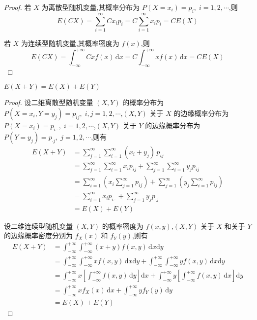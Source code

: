 \begin{proof}
    若 $X$ 为离散型随机变量,其概率分布为 $P(X=x_i)=p_i, \; i=1,2,\cdots$,则
    $$
    E(CX) = \sum_{i=1}^{\infty} C x_i p_i = C \sum_{i=1}^{\infty} x_i p_i = CE(X)
    $$

    若 $X$ 为连续型随机变量,其概率密度为 $f(x)$,则
    $$
    E(CX) = \int_{-\infty}^{+\infty} Cx f(x) \, \text{d}x = C \int_{-\infty}^{+\infty} x f(x) \, \text{d}x = CE(X)
    $$
\end{proof}

\begin{property}[][][property:E(X+Y)=E(X)+E(Y)]
    \indent $E(X+Y)=E(X)+E(Y)$
\end{property}

\begin{proof}
    设二维离散型随机变量 $(X,Y)$ 的概率分布为 $P(X=x_i,Y=y_j) = p_{ij}, \; i,j=1,2,\cdots$,$(X,Y)$ 关于 $X$ 的边缘概率分布为 $P(X=x_i)=p_{i\cdot}, \; i=1,2,\cdots$,$(X,Y)$ 关于 $Y$ 的边缘概率分布为 $P(Y=y_j)=p_{\cdot j}, \; j=1,2,\cdots$,则有
    $$
    \begin{aligned}
        E(X+Y) &= \sum_{j=1}^{\infty} \sum_{i=1}^{\infty} (x_i + y_j) \, p_{ij} \\
        &= \sum_{j=1}^{\infty} \sum_{i=1}^{\infty} x_i p_{ij} + \sum_{j=1}^{\infty} \sum_{i=1}^{\infty} y_j p_{ij} \\
        &= \sum_{i=1}^{\infty} \left( x_i \sum_{j=1}^{\infty} p_{ij} \right) + \sum_{j=1}^{\infty} \left( y_j \sum_{i=1}^{\infty} p_{ij} \right) \\
        &= \sum_{i=1}^{\infty} x_i p_{i \cdot} + \sum_{j=1}^{\infty} y_j p_{\cdot j} \\
        &= E(X)+E(Y)
    \end{aligned}
    $$

    设二维连续型随机变量 $(X,Y)$ 的概率密度为 $f(x,y)$,$(X,Y)$ 关于 $X$ 和关于 $Y$ 的边缘概率密度分别为 $f_X(x)$ 和 $f_Y(y)$,则有
    $$
    \begin{aligned}
        E(X+Y) &= \int_{-\infty}^{+\infty} \int_{-\infty}^{+\infty} (x+y) f(x,y) \, \text{d}x \text{d}y \\
        &= \int_{-\infty}^{+\infty} \int_{-\infty}^{+\infty} x f(x,y) \, \text{d}x \text{d}y + \int_{-\infty}^{+\infty} \int_{-\infty}^{+\infty} y f(x,y) \, \text{d}x \text{d}y \\
        &= \int_{-\infty}^{+\infty} x \left[ \int_{-\infty}^{+\infty} f(x,y) \, \text{d}y \right] \text{d}x + \int_{-\infty}^{+\infty} y \left[ \int_{-\infty}^{+\infty} f(x,y) \, \text{d}x \right] \text{d}y \\
        &= \int_{-\infty}^{+\infty} x f_X(x) \, \text{d}x + \int_{-\infty}^{+\infty} y f_Y(y) \, \text{d}y \\
        &= E(X)+E(Y)
    \end{aligned}
    $$
\end{proof}

